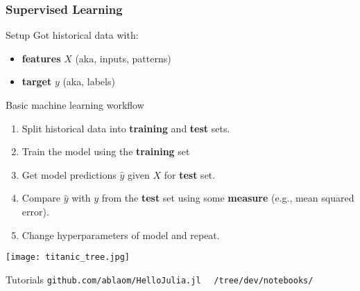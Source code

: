 \documentclass[t]{beamer}
\newcommand\df{\bf\color{Maroon}}
\begin{document}
 \begin{frame}
   \frametitle{Supervised Learning}
   \begin{block}{Setup}
     Got historical data with:
     \begin{itemize}
     \item {\df features}  $X$ (aka, inputs, patterns)
     \item {\df target} $y$ (aka, labels)\pause
     \end{itemize}
   \end{block}
   \begin{block}{Basic machine learning workflow}
     \begin{enumerate}
     \item Split historical data into {\df training} and {\df test} sets.\pause
     \item Train the model using the {\df training} set\pause
     \item Get model predictions $\hat y$ given $X$ for {\df test} set.\pause
     \item Compare $\hat y$ with $y$ from the {\df test} set using some {\df measure} (e.g.,
       mean squared error).\pause
     \item Change hyperparameters of model and repeat.
     \end{enumerate}
   \end{block}
 \end{frame}

\begin{frame}[plain]
  \begin{center}
     \texttt{[image: titanic\_tree.jpg]}
   \end{center}
\end{frame}

\begin{frame}
  \begin{block}{Tutorials}
    {\large\texttt{github.com/ablaom/HelloJulia.jl}}\newline
    {\large\mbox{~~}\texttt{/tree/dev/notebooks/}}
    \end{block}
\end{frame}
\end{document}
